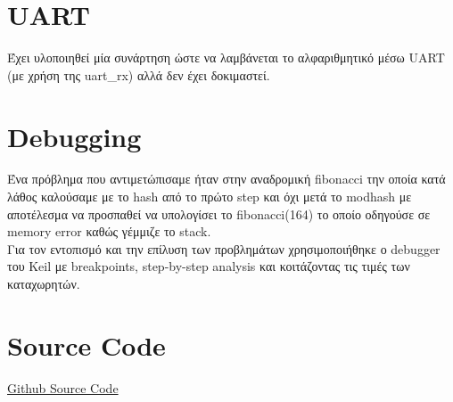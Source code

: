 \documentclass{article}
\begin{document}
\section{UART}
Έχει υλοποιηθεί μία συνάρτηση ώστε να λαμβάνεται το αλφαριθμητικό μέσω UART (με χρήση της uart\_rx) αλλά δεν έχει δοκιμαστεί. \\

\section{Debugging}
Ένα πρόβλημα που αντιμετώπισαμε ήταν στην αναδρομική fibonacci την οποία κατά λάθος καλούσαμε με το hash από το πρώτο step και όχι μετά το modhash με αποτέλεσμα να προσπαθεί να υπολογίσει το fibonacci(164) το οποίο οδηγούσε σε memory error καθώς γέμμιζε το stack. \\
Για τον εντοπισμό και την επίλυση των προβλημάτων χρησιμοποιήθηκε ο debugger του Keil με breakpoints, step-by-step analysis και κοιτάζοντας τις τιμές των καταχωρητών. \\

\section{Source Code}
\href{https://github.com/charisvt/micro-lab1}{Github Source Code} \\
\end{document}
